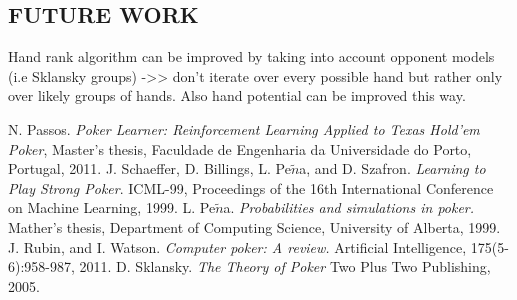 \subsection{FUTURE WORK}
Hand rank algorithm can be improved by taking into account opponent models (i.e Sklansky groups) ->> don't iterate over every possible hand but rather only over likely groups of hands. Also hand potential can be improved this way.
\pagebreak
\begin{thebibliography}{9}
  N. Passos.
  \textit{Poker Learner: Reinforcement Learning Applied to Texas Hold'em Poker},
  Master's thesis, Faculdade de Engenharia da Universidade do Porto, Portugal, 
  2011.
  \href{https://paginas.fe.up.pt/~ei08029/Master\%20Thesis\%20-\%20Nuno\%20Passos.pdf}{}
   J. Schaeffer, D. Billings, L. Pe$\tilde{n}$a, and D. Szafron.
  \textit{Learning to Play Strong Poker}.
  ICML-99, Proceedings of the 16th International Conference on Machine Learning, 
  1999.
  \href{http://poker.cs.ualberta.ca/publications/ICML99.pdf}{}
  L. Pe$\tilde{n}$a.
  \textit{Probabilities and simulations in poker.}
  Mather's thesis, Department of Computing Science, University of Alberta,
  1999.
  J. Rubin, and I. Watson.
  \textit{Computer poker: A review.}
   Artificial Intelligence, 175(5-6):958-987,
  2011.
  D. Sklansky.
  \textit{The Theory of Poker}
   Two Plus Two Publishing,
  2005.
  \end{thebibliography}

\FloatBarrier\label{end-of-document}


